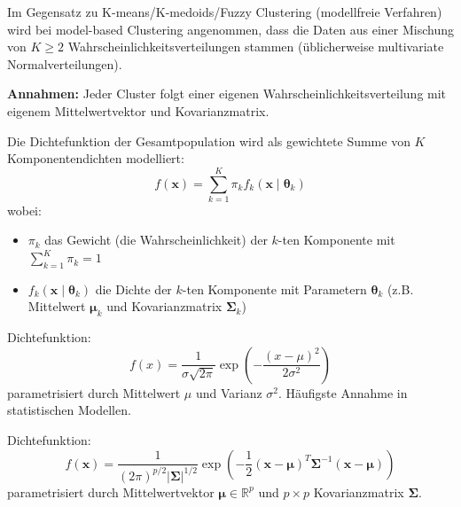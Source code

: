 Im Gegensatz zu K-means/K-medoids/Fuzzy Clustering (modellfreie Verfahren) wird bei model-based Clustering angenommen, dass die Daten aus einer Mischung von $K \geq 2$ Wahrscheinlichkeitsverteilungen stammen (üblicherweise multivariate Normalverteilungen).

\textbf{Annahmen:} Jeder Cluster folgt einer eigenen Wahrscheinlichkeitsverteilung mit eigenem Mittelwertvektor und Kovarianzmatrix.

Die Dichtefunktion der Gesamtpopulation wird als gewichtete Summe von $K$ Komponentendichten modelliert:
$$f(\mathbf{x}) = \sum_{k=1}^{K} \pi_k f_k(\mathbf{x} \mid \boldsymbol{\theta}_k)$$
wobei:
\begin{itemize}[leftmargin=1.5em]
    \item $\pi_k$ das Gewicht (die Wahrscheinlichkeit) der $k$-ten Komponente mit $\sum_{k=1}^{K} \pi_k = 1$
    \item $f_k(\mathbf{x} \mid \boldsymbol{\theta}_k)$ die Dichte der $k$-ten Komponente mit Parametern $\boldsymbol{\theta}_k$ (z.B. Mittelwert $\boldsymbol{\mu}_k$ und Kovarianzmatrix $\boldsymbol{\Sigma}_k$)
\end{itemize}

Dichtefunktion:
$$f(x) = \frac{1}{\sigma\sqrt{2\pi}} \exp\left(-\frac{(x-\mu)^2}{2\sigma^2}\right)$$
parametrisiert durch Mittelwert $\mu$ und Varianz $\sigma^2$. Häufigste Annahme in statistischen Modellen.

Dichtefunktion:
$$f(\mathbf{x}) = \frac{1}{(2\pi)^{p/2} |\boldsymbol{\Sigma}|^{1/2}} \exp\left(-\frac{1}{2}(\mathbf{x}-\boldsymbol{\mu})^T \boldsymbol{\Sigma}^{-1} (\mathbf{x}-\boldsymbol{\mu})\right)$$
parametrisiert durch Mittelwertvektor $\boldsymbol{\mu} \in \mathbb{R}^p$ und $p \times p$ Kovarianzmatrix $\boldsymbol{\Sigma}$.

